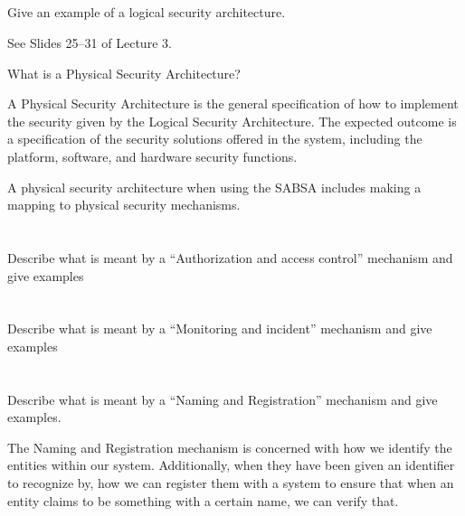 \begin{questions}
\begin{parts}
  \part{} Give an example of a logical security architecture.
    \begin{solution}
      See Slides 25--31 of Lecture 3.
    \end{solution}
  \end{parts}

\question{} What is a Physical Security Architecture?
  \begin{solution}
    A Physical Security Architecture is the general specification of how to implement the security given by the Logical Security Architecture.
    The expected outcome is a specification of the security solutions offered in the system, including the platform, software, and hardware security functions.
  \end{solution}

\question{} A physical security architecture when using the SABSA includes making a mapping to physical security mechanisms.
  \begin{parts}
  \part{} Describe what is meant by a ``Authorization and access control'' mechanism and give examples
  \part{} Describe what is meant by a ``Monitoring and incident'' mechanism and give examples
  \part{} Describe what is meant by a ``Naming and Registration'' mechanism and give examples.
    \begin{solution}
      The Naming and Registration mechanism is concerned with how we identify the entities within our system.
      Additionally, when they have been given an identifier to recognize by, how we can register them with a system to ensure that when an entity claims to be something with a certain name, we can verify that.


\end{solution}
\end{parts}
\end{questions}

